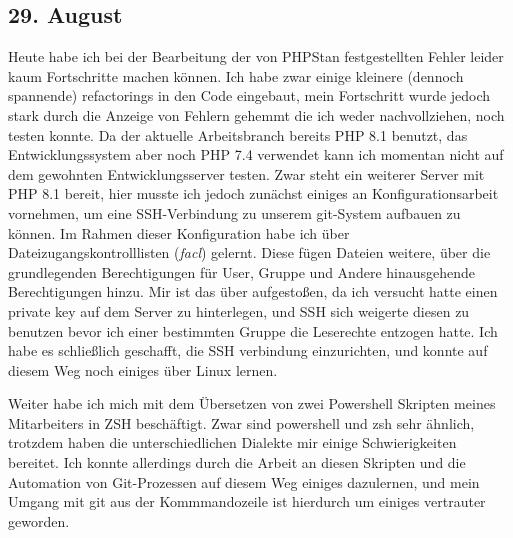 \subsection{29. August}
Heute habe ich bei der Bearbeitung der von PHPStan festgestellten Fehler leider kaum Fortschritte machen können. Ich habe zwar einige kleinere (dennoch spannende) refactorings in den Code eingebaut, mein Fortschritt wurde jedoch stark durch die Anzeige von Fehlern gehemmt die ich weder nachvollziehen, noch testen konnte. Da der aktuelle Arbeitsbranch bereits PHP 8.1 benutzt, das Entwicklungssystem aber noch PHP 7.4 verwendet kann ich momentan nicht auf dem gewohnten Entwicklungsserver testen. Zwar steht ein weiterer Server mit PHP 8.1 bereit, hier musste ich jedoch zunächst einiges an Konfigurationsarbeit vornehmen, um eine SSH-Verbindung zu unserem git-System aufbauen zu können. Im Rahmen dieser Konfiguration habe ich über Dateizugangskontrolllisten (\textit{facl}) gelernt. Diese fügen Dateien weitere, über die grundlegenden Berechtigungen für User, Gruppe und Andere hinausgehende Berechtigungen hinzu. Mir ist das über aufgestoßen, da ich versucht hatte einen private key auf dem Server zu hinterlegen, und SSH sich weigerte diesen zu benutzen bevor ich einer bestimmten Gruppe die Leserechte entzogen hatte. Ich habe es schließlich geschafft, die SSH verbindung einzurichten, und konnte auf diesem Weg noch einiges über Linux lernen.

Weiter habe ich mich mit dem Übersetzen von zwei Powershell Skripten meines Mitarbeiters in ZSH beschäftigt. Zwar sind powershell und zsh sehr ähnlich, trotzdem haben die unterschiedlichen Dialekte mir einige Schwierigkeiten bereitet. Ich konnte allerdings durch die Arbeit an diesen Skripten und die Automation von Git-Prozessen auf diesem Weg einiges dazulernen, und mein Umgang mit git aus der Kommmandozeile ist hierdurch um einiges vertrauter geworden.